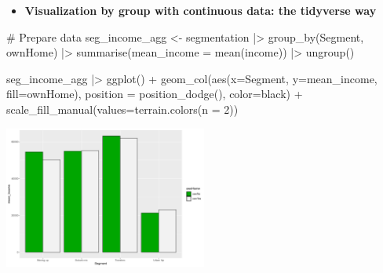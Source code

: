 \documentclass[
  ignorenonframetext,
]{beamer}
\newenvironment{Shaded}{\begin{snugshade}}{\end{snugshade}}
\newcommand{\AttributeTok}[1]{\textcolor[rgb]{0.40,0.45,0.13}{#1}}
\newcommand{\CommentTok}[1]{\textcolor[rgb]{0.37,0.37,0.37}{#1}}
\newcommand{\DecValTok}[1]{\textcolor[rgb]{0.68,0.00,0.00}{#1}}
\newcommand{\FunctionTok}[1]{\textcolor[rgb]{0.28,0.35,0.67}{#1}}
\newcommand{\NormalTok}[1]{\textcolor[rgb]{0.00,0.23,0.31}{#1}}
\newcommand{\OtherTok}[1]{\textcolor[rgb]{0.00,0.23,0.31}{#1}}
\newcommand{\SpecialCharTok}[1]{\textcolor[rgb]{0.37,0.37,0.37}{#1}}
\newcommand{\StringTok}[1]{\textcolor[rgb]{0.13,0.47,0.30}{#1}}
\providecommand{\tightlist}{%
  \setlength{\itemsep}{0pt}\setlength{\parskip}{0pt}}\usepackage{longtable,booktabs,array}
\begin{document}
\begin{frame}[fragile]{}
\label{section-18}
\begin{itemize}
\tightlist
\item
  \textbf{Visualization by group with continuous data: the tidyverse
  way}
\end{itemize}

\tiny

\begin{Shaded}
\begin{Highlighting}[]
\CommentTok{\# Prepare data}
\NormalTok{seg\_income\_agg }\OtherTok{\textless{}{-}}\NormalTok{ segmentation }\SpecialCharTok{|\textgreater{}} 
  \FunctionTok{group\_by}\NormalTok{(Segment, ownHome) }\SpecialCharTok{|\textgreater{}} 
  \FunctionTok{summarise}\NormalTok{(}\AttributeTok{mean\_income =} \FunctionTok{mean}\NormalTok{(income)) }\SpecialCharTok{|\textgreater{}} 
  \FunctionTok{ungroup}\NormalTok{()}
\end{Highlighting}
\end{Shaded}

\begin{Shaded}
\begin{Highlighting}[]
\NormalTok{seg\_income\_agg }\SpecialCharTok{|\textgreater{}} \FunctionTok{ggplot}\NormalTok{() }\SpecialCharTok{+}
  \FunctionTok{geom\_col}\NormalTok{(}\FunctionTok{aes}\NormalTok{(}\AttributeTok{x=}\NormalTok{Segment, }\AttributeTok{y=}\NormalTok{mean\_income, }\AttributeTok{fill=}\NormalTok{ownHome),}
           \AttributeTok{position =} \FunctionTok{position\_dodge}\NormalTok{(), }\AttributeTok{color=}\StringTok{\textquotesingle{}black\textquotesingle{}}\NormalTok{) }\SpecialCharTok{+}
  \FunctionTok{scale\_fill\_manual}\NormalTok{(}\AttributeTok{values=}\FunctionTok{terrain.colors}\NormalTok{(}\AttributeTok{n =} \DecValTok{2}\NormalTok{))}
\end{Highlighting}
\end{Shaded}

\begin{center}
\includegraphics[width=0.5\textwidth,height=\textheight]{005_comparing_groups_tables_and_visualizations_files/figure-beamer/unnamed-chunk-20-1.pdf}
\end{center}
\end{frame}
\end{document}
